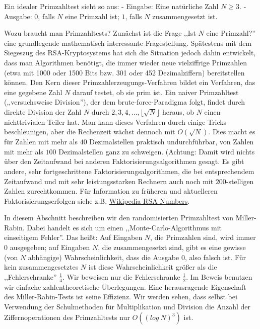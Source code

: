 \documentclass[a4paper]{article}
\begin{document}
\begin{multicols}{3}
        Ein idealer Primzahltest sieht so aus:
        - Eingabe: Eine natürliche Zahl $N\geq 3$.
        - Ausgabe: $0$, falls $N$ eine Primzahl ist; $1$, falls $N$ zusammengesetzt ist.

        Wozu braucht man Primzahltests? Zunächst ist die Frage ,,Ist $N$ eine Primzahl?'' eine grundlegende mathematisch interessante Fragestellung. Spätestens mit dem Siegeszug des RSA-Kryptosystems hat sich die Situation jedoch dahin entwickelt, dass man Algorithmen benötigt, die immer wieder neue vielziffrige Primzahlen (etwa mit 1000 oder 1500 Bits bzw. 301 oder 452 Dezimalziffern) bereitstellen können. Den Kern dieser Primzahlerzeugungs-Verfahren bildet ein Verfahren, das eine gegebene Zahl $N$ darauf testet, ob sie prim ist. Ein naiver Primzahltest (,,versuchsweise Division''), der dem brute-force-Paradigma folgt, findet durch direkte Division der Zahl $N$ durch $2,3,4,...,\lfloor\sqrt{N}\rfloor$ heraus, ob $N$ einen nichttrivialen Teiler hat. Man kann dieses Verfahren durch einige Tricks beschleunigen, aber die Rechenzeit wächst dennoch mit $O(\sqrt{N})$. Dies macht es für Zahlen mit mehr als $40$ Dezimalstellen praktisch undurchführbar, von Zahlen mit mehr als $100$ Dezimalstellen ganz zu schweigen. (Achtung: Damit wird nichts über den Zeitaufwand bei anderen Faktorisierungsalgorithmen gesagt. Es gibt andere, sehr fortgeschrittene Faktorisierungsalgorithmen, die bei entsprechendem Zeitaufwand und mit sehr leistungsstarken Rechnern auch noch mit $200$-stelligen Zahlen zurechtkommen. Für Information zu früheren und aktuelleren Faktorisierungserfolgen siehe z.B. \href{http://en.wikipedia.org/wiki/RSA_numbers}{Wikipedia RSA Numbers}.

        In diesem Abschnitt beschreiben wir den randomisierten Primzahltest von Miller-Rabin. Dabei handelt es sich um einen ,,Monte-Carlo-Algorithmus mit einseitigem Fehler''. Das heißt: Auf Eingaben $N$, die Primzahlen sind, wird immer $0$ ausgegeben; auf Eingaben $N$, die zusammengesetzt sind, gibt es eine gewisse (von $N$ abhängige) Wahrscheinlichkeit, dass die Ausgabe $0$, also falsch ist. Für kein zusammengesetztes $N$ ist diese Wahrscheinlichkeit größer als die ,,Fehlerschranke'' $\frac{1}{4}$. Wir beweisen nur die Fehlerschranke $\frac{1}{2}$. Im Beweis benutzen wir einfache zahlentheoretische Überlegungen. Eine herausragende Eigenschaft des Miller-Rabin-Tests ist seine Effizienz. Wir werden sehen, dass selbst bei Verwendung der Schulmethoden für Multiplikation und Division die Anzahl der Ziffernoperationen des Primzahltests nur $O((log\ N)^3)$ ist.


\end{multicols}
\end{document}
